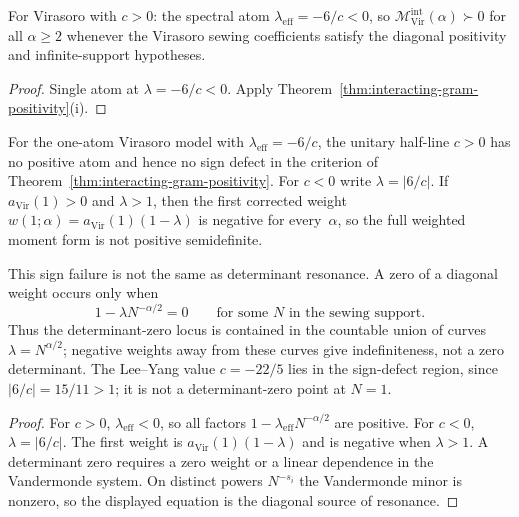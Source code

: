 \begin{corollary}[\ClaimStatusProvedHere]%
\label{cor:virasoro-interacting-gram}%
For Virasoro with $c > 0$: the spectral atom
$\lambda_{\mathrm{eff}} = -6/c < 0$, so
$\mathscr{M}^{\mathrm{int}}_{\mathrm{Vir}}(\alpha) \succ 0$
for all $\alpha \geq 2$ whenever the Virasoro sewing coefficients
satisfy the diagonal positivity and infinite-support hypotheses.
\end{corollary}

\begin{proof}
Single atom at $\lambda = -6/c < 0$.
Apply Theorem~\ref{thm:interacting-gram-positivity}(i).
\end{proof}

\begin{theorem}%
\label{thm:shadow-resonance-locus}%
%
For the one-atom Virasoro model with
$\lambda_{\mathrm{eff}}=-6/c$, the unitary half-line $c>0$ has no
positive atom and hence no sign defect in the criterion of
Theorem~\ref{thm:interacting-gram-positivity}. For $c<0$ write
$\lambda=|6/c|$. If $a_{\mathrm{Vir}}(1)>0$ and $\lambda>1$, then the
first corrected weight $w(1;\alpha)=a_{\mathrm{Vir}}(1)(1-\lambda)$ is
negative for every~$\alpha$, so the full weighted moment form is not
positive semidefinite.

This sign failure is not the same as determinant resonance. A zero of a
diagonal weight occurs only when
\[
  1-\lambda N^{-\alpha/2}=0
  \qquad\text{for some } N \text{ in the sewing support}.
\]
Thus the determinant-zero locus is contained in the countable union of
curves $\lambda=N^{\alpha/2}$; negative weights away from these curves
give indefiniteness, not a zero determinant. The Lee--Yang value
$c=-22/5$ lies in the sign-defect region, since $|6/c|=15/11>1$; it is
not a determinant-zero point at $N=1$.
\end{theorem}

\begin{proof}
For $c>0$, $\lambda_{\mathrm{eff}}<0$, so all factors
$1-\lambda_{\mathrm{eff}}N^{-\alpha/2}$ are positive. For $c<0$,
$\lambda=|6/c|$. The first weight is
$a_{\mathrm{Vir}}(1)(1-\lambda)$ and is negative when $\lambda>1$.
A determinant zero requires a zero weight or a linear dependence in the
Vandermonde system. On distinct powers $N^{-s_i}$ the Vandermonde
minor is nonzero, so the displayed equation is the diagonal source of
resonance.
\end{proof}


